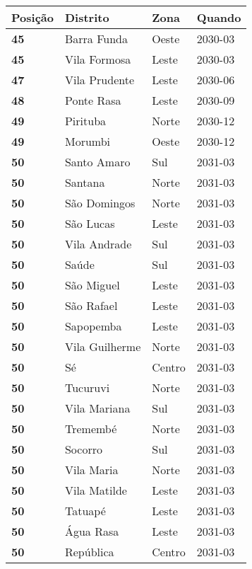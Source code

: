 \begin{table}[H]
	\centering
	\begin{tabular}{l|l|l|l}
		\textbf{Posição} & \textbf{Distrito} & \textbf{Zona} & \textbf{Quando} \\ \hline
		\textbf{45} & Barra Funda & Oeste & 2030-03\\ \hline
		\textbf{45} & Vila Formosa & Leste & 2030-03\\ \hline
		\textbf{47} & Vila Prudente & Leste & 2030-06\\ \hline
		\textbf{48} & Ponte Rasa & Leste & 2030-09\\ \hline
		\textbf{49} & Pirituba & Norte & 2030-12\\ \hline
		\textbf{49} & Morumbi & Oeste & 2030-12\\ \hline
		\textbf{50} & Santo Amaro & Sul & 2031-03\\ \hline
		\textbf{50} & Santana & Norte & 2031-03\\ \hline
		\textbf{50} & São Domingos & Norte & 2031-03\\ \hline
		\textbf{50} & São Lucas & Leste & 2031-03\\ \hline
		\textbf{50} & Vila Andrade & Sul & 2031-03\\ \hline
		\textbf{50} & Saúde & Sul & 2031-03\\ \hline
		\textbf{50} & São Miguel & Leste & 2031-03\\ \hline
		\textbf{50} & São Rafael & Leste & 2031-03\\ \hline
		\textbf{50} & Sapopemba & Leste & 2031-03\\ \hline
		\textbf{50} & Vila Guilherme & Norte & 2031-03\\ \hline
		\textbf{50} & Sé & Centro & 2031-03\\ \hline
		\textbf{50} & Tucuruvi & Norte & 2031-03\\ \hline
		\textbf{50} & Vila Mariana & Sul & 2031-03\\ \hline
		\textbf{50} & Tremembé & Norte & 2031-03\\ \hline
		\textbf{50} & Socorro & Sul & 2031-03\\ \hline
		\textbf{50} & Vila Maria & Norte & 2031-03\\ \hline
		\textbf{50} & Vila Matilde & Leste & 2031-03\\ \hline
		\textbf{50} & Tatuapé & Leste & 2031-03\\ \hline
		\textbf{50} & Água Rasa & Leste & 2031-03\\ \hline
		\textbf{50} & República & Centro & 2031-03\\ \hline

\end{tabular}
\end{table}
